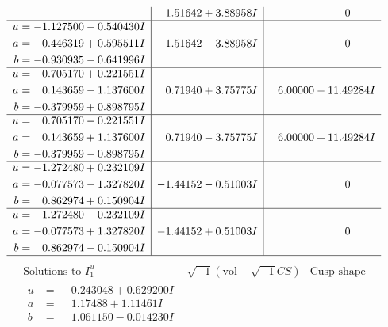 \documentclass[1p]{elsarticle_modified}
\theoremstyle{definition}
\newcommand{\I}{\sqrt{-1}}
\begin{document}
$$\begin{array}{c|c|c}
 & \phantom{-}1.51642 + 3.88958 I & \phantom{-0.000000 } 0 \\ \hline\begin{aligned}
u &= -1.127500 - 0.540430 I \\
a &= \phantom{-}0.446319 + 0.595511 I \\
b &= -0.930935 - 0.641996 I\end{aligned}
 & \phantom{-}1.51642 - 3.88958 I & \phantom{-0.000000 } 0 \\ \hline\begin{aligned}
u &= \phantom{-}0.705170 + 0.221551 I \\
a &= \phantom{-}0.143659 - 1.137600 I \\
b &= -0.379959 + 0.898795 I\end{aligned}
 & \phantom{-}0.71940 + 3.75775 I & \phantom{-}6.00000 - 11.49284 I \\ \hline\begin{aligned}
u &= \phantom{-}0.705170 - 0.221551 I \\
a &= \phantom{-}0.143659 + 1.137600 I \\
b &= -0.379959 - 0.898795 I\end{aligned}
 & \phantom{-}0.71940 - 3.75775 I & \phantom{-}6.00000 + 11.49284 I \\ \hline\begin{aligned}
u &= -1.272480 + 0.232109 I \\
a &= -0.077573 - 1.327820 I \\
b &= \phantom{-}0.862974 + 0.150904 I\end{aligned}
 & -1.44152 - 0.51003 I & \phantom{-0.000000 } 0 \\ \hline\begin{aligned}
u &= -1.272480 - 0.232109 I \\
a &= -0.077573 + 1.327820 I \\
b &= \phantom{-}0.862974 - 0.150904 I\end{aligned}
 & -1.44152 + 0.51003 I & \phantom{-0.000000 } 0\\
 \hline 
 \end{array}$$\newpage$$\begin{array}{c|c|c}  
\text{Solutions to }I^u_{1}& \I (\text{vol} + \sqrt{-1}CS) & \text{Cusp shape}\\
 \hline 
\begin{aligned}
u &= \phantom{-}0.243048 + 0.629200 I \\
a &= \phantom{-}1.17488 + 1.11461 I \\
b &= \phantom{-}1.061150 - 0.014230 I\end{aligned}

\end{array}$$
\end{document}
